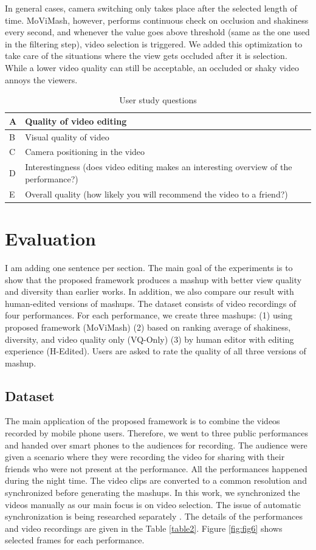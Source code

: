 \documentclass{sig-alternate}
\begin{document}
In general cases, camera switching only takes place after the selected length of time. MoViMash, however, performs continuous
check on occlusion and shakiness every second, and whenever the
value goes above threshold (same as the one used in the filtering
step), video selection is triggered. We added this optimization to
take care of the situations where the view gets occluded after it is selection. While a lower video quality can still be acceptable, an occluded or shaky video annoys the viewers.

\begin{table}
\small
\centering
\caption{User study questions}
\label{table3}
\begin{tabularx}{8cm}{p{0.15cm}|p{7.2cm}}
\hline
A & Quality of video editing\\
\hline
B & Visual quality of video\\
\hline
C & Camera positioning in the video\\
\hline
D & Interestingness (does video editing makes an interesting
overview of the performance?)\\
\hline
E & Overall quality (how likely you will recommend the video to
a friend?)\\
\hline
\end{tabularx}
\end{table}

\section{Evaluation}\label{eval}
I am adding one sentence per section.
The main goal of the experiments is to show that the proposed
framework produces a mashup with better view quality and diversity
than earlier works. In addition, we also compare our result with
human-edited versions of mashups. The dataset consists of video
recordings of four performances. For each performance, we create
three mashups: (1) using proposed framework (MoViMash) (2) based on ranking average of shakiness, diversity, and video quality only (VQ-Only) (3) by human editor with editing experience (H-Edited).
Users are asked to rate the quality of all three versions of mashup.

\subsection{Dataset}
The main application of the proposed framework is to combine
the videos recorded by mobile phone users. Therefore, we went to
three public performances and handed over smart phones to the audiences for recording. The audience were given a scenario where
they were recording the video for sharing with their friends who
were not present at the performance. All the performances happened
during the night time. The video clips are converted to a common resolution and synchronized before generating the mashups. In this work, we synchronized the videos manually as our main focus is on video selection. The issue of automatic synchronization is being researched separately \cite{14}. The details of the performances and video recordings are given in the Table \ref{table2}. Figure \ref{fig:fig6} shows selected frames for each performance.
\end{document}
